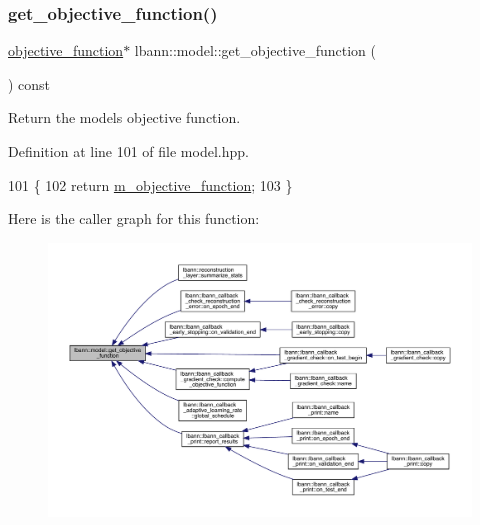 \subsubsection{\texorpdfstring{get\+\_\+objective\+\_\+function()}{get\_objective\_function()}}
{\footnotesize\ttfamily \hyperlink{classlbann_1_1objective__function}{objective\+\_\+function}$\ast$ lbann\+::model\+::get\+\_\+objective\+\_\+function (\begin{DoxyParamCaption}{ }\end{DoxyParamCaption}) const\hspace{0.3cm}{\ttfamily [inline]}}

Return the model\textquotesingle{}s objective function. 

Definition at line 101 of file model.\+hpp.


\begin{DoxyCode}
101                                                      \{
102     \textcolor{keywordflow}{return} \hyperlink{classlbann_1_1model_a24c50e7108dd7698671aed7df5b22e8b}{m\_objective\_function};
103   \}
\end{DoxyCode}
Here is the caller graph for this function\+:\nopagebreak
\begin{figure}[H]
\begin{center}
\leavevmode
\includegraphics[width=350pt]{classlbann_1_1model_aee5530467523924a662dec891b9a7993_icgraph}
\end{center}
\end{figure}
\mbox{\label{classlbann_1_1model_a90363b6a20269cf7197701e49f1f52a3}} 
